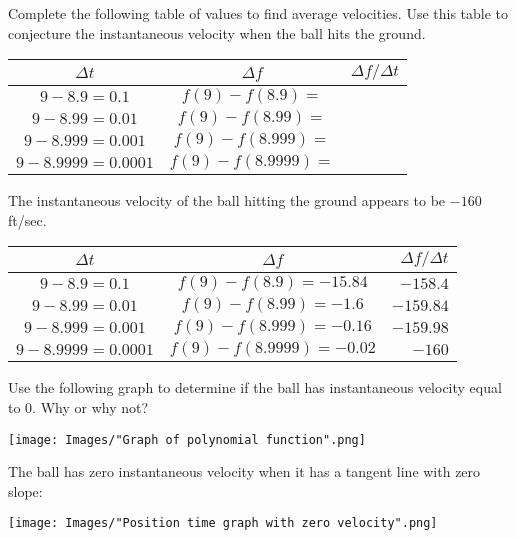 \documentclass[nooutcomes]{ximera}
\renewenvironment{freeResponse}{
\ifhandout\setbox0\vbox\bgroup\else
\begin{trivlist}\item[\hskip \labelsep\bfseries Solution:\hspace{2ex}]
\fi}
{\ifhandout\egroup\else
\end{trivlist}
\fi}
\begin{document}
\begin{problem}
\begin{itemize}
   \item[(f)]
     Complete the following table of values to find average velocities.
     Use this table to conjecture the instantaneous velocity when the ball hits the ground.
     \begin{center}
       \begin{tabular}[c]{ccr}
         \toprule
         $\Delta  t$ & $\Delta f$ & \hspace{8em}$\Delta f / \Delta t$\\
         \midrule
         $9 - 8.9 = 0.1$ & $f(9) - f(8.9) = $ & \\
         $9 - 8.99 = 0.01$ & $f(9) - f(8.99) = $ & \\
         $9 - 8.999 = 0.001$ & $f(9) - f(8.999) = $ & \\
         $9 - 8.9999 = 0.0001$ & $f(9) - f(8.9999) = $ & \\
         \bottomrule
       \end{tabular}
     \end{center}
     \begin{freeResponse}
      The instantaneous velocity of the ball hitting the ground appears to be $-160$ ft/sec.
      \begin{center}
        \begin{tabular}[c]{ccr}
          \toprule
          $\Delta  t$ & $\Delta f$ & \hspace{4em}$\Delta f / \Delta t$\\
          \midrule
          $9 - 8.9 = 0.1$ & $f(9) - f(8.9) = -15.84 $ & $-158.4$ \\
          $9 - 8.99 = 0.01$ & $f(9) - f(8.99) = -1.6$ & $-159.84$\\
          $9 - 8.999 = 0.001$ & $f(9) - f(8.999) = -0.16$ & $-159.98$\\
          $9 - 8.9999 = 0.0001$ & $f(9) - f(8.9999) = -0.02$ & $-160$\\
          \bottomrule
        \end{tabular}
      \end{center}
      
     \end{freeResponse}
    \item[(g)]
      Use the following graph to determine if the ball has instantaneous velocity equal to 0.
      Why or why not?
      \begin{image}
        \texttt{[image: Images/"Graph of polynomial function".png]}
      \end{image}
      \begin{freeResponse}
        The ball has zero instantaneous velocity when it has a tangent line with zero slope:
        \begin{image}
          \texttt{[image: Images/"Position time graph with zero velocity".png]}
        \end{image}
      \end{freeResponse}
    

\end{itemize}
\end{problem}
\end{document}
